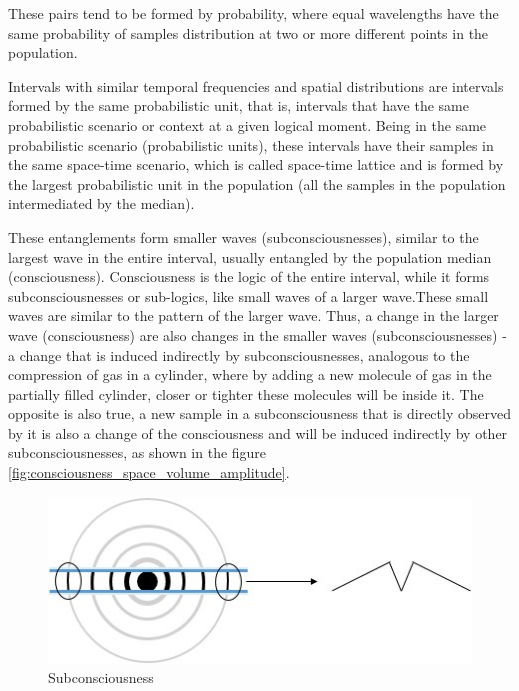 These pairs tend to be formed by probability, where equal wavelengths have the same probability of samples distribution at two or more different points in the population. 

Intervals with similar temporal frequencies and spatial distributions are intervals formed by the same probabilistic unit, that is, intervals that have the same probabilistic scenario or context at a given logical moment. Being in the same probabilistic scenario (probabilistic units), these intervals have their samples in the same space-time scenario, which is called space-time lattice and is formed by the largest probabilistic unit in the population (all the samples in the population intermediated by the median). 

These entanglements form smaller waves (subconsciousnesses), similar to the largest wave in the entire interval, usually entangled by the population median (consciousness). Consciousness is the logic of the entire interval, while it forms subconsciousnesses or sub-logics, like small waves of a larger wave.These small waves are similar to the pattern of the larger wave.  Thus, a change in the larger wave (consciousness) are also changes in the smaller waves (subconsciousnesses) - a change that is induced indirectly by subconsciousnesses, analogous to the compression of gas in a cylinder, where by adding a new molecule of gas in the partially filled cylinder, closer or tighter these molecules will be inside it.  The opposite is also true, a new sample in a subconsciousness that is directly observed by it is also a change of the consciousness and will be induced indirectly by other subconsciousnesses, as shown in the figure \ref{fig:consciousness_space_volume_amplitude}.
	\begin{figure}[H]
	\caption{Subconsciousness}
	\label{fig:consciousness_subconscious}
	\centering
	\includegraphics[scale=.8]{sections/images/consciousness_subconscious.jpg}
	\end{figure}
	

